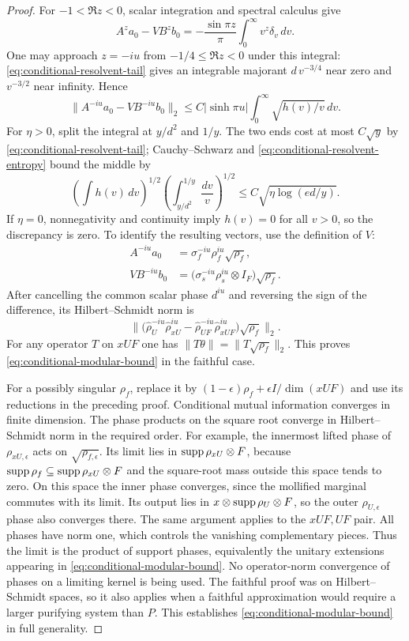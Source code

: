 \begin{proof}
For $-1<\Re z<0$, scalar integration and spectral calculus give
\[
 A^za_0-VB^zb_0
 =-\frac{\sin\pi z}{\pi}
       \int_0^\infty v^z\delta_v\,dv.
\]
One may approach $z=-iu$ from $-1/4\le\Re z<0$ under this
integral: \eqref{eq:conditional-resolvent-tail} gives an
integrable majorant $d\,v^{-3/4}$ near zero and $v^{-3/2}$ near
infinity.  Hence
\[
 \|A^{-iu}a_0-VB^{-iu}b_0\|_2
 \le C|\sinh\pi u|\int_0^\infty\sqrt{h(v)/v}\,dv.
\]
For $\eta>0$, split the integral at $y/d^2$ and $1/y$.
The two ends cost at most $C\sqrt y$ by
\eqref{eq:conditional-resolvent-tail}; Cauchy--Schwarz and
\eqref{eq:conditional-resolvent-entropy} bound the middle by
\[
 \left(\int h(v)\,dv\right)^{1/2}
 \left(\int_{y/d^2}^{1/y}\frac{dv}{v}\right)^{1/2}
 \le C\sqrt{\eta\log(ed/y)}.
\]
If $\eta=0$, nonnegativity and continuity imply $h(v)=0$ for
all $v>0$, so the discrepancy is zero.  To identify the resulting
vectors, use the definition of $V$:
\[
 \begin{split}
 A^{-iu}a_0
   &=\sigma_f^{-iu}\rho_f^{iu}\sqrt{\rho_f},\\
 VB^{-iu}b_0
   &=\bigl(\sigma_s^{-iu}\rho_s^{iu}\otimes I_F\bigr)
                                      \sqrt{\rho_f}.
 \end{split}
\]
After cancelling the common scalar phase $d^{iu}$ and reversing the
sign of the difference, its Hilbert--Schmidt norm is
\[
 \big\|\big(\widehat\rho_U^{-iu}\widehat\rho_{xU}^{iu}
       -\widehat\rho_{UF}^{-iu}\widehat\rho_{xUF}^{iu}\big)
                                    \sqrt{\rho_f}\big\|_2.
\]
For any operator $T$ on $xUF$ one has
$\|T\theta\|=\|T\sqrt{\rho_f}\|_2$.  This proves
\eqref{eq:conditional-modular-bound} in the faithful case.

For a possibly singular $\rho_f$, replace it by
$(1-\epsilon)\rho_f+\epsilon I/\dim(xUF)$ and use its
reductions in the preceding proof.  Conditional mutual information
converges in finite dimension.  The phase products on the square
root converge in Hilbert--Schmidt norm in the required order.
For example, the innermost lifted phase of $\rho_{xU,\epsilon}$
acts on $\sqrt{\rho_{f,\epsilon}}$.  Its limit lies in
$\operatorname{supp}\rho_{xU}\otimes F$, because
$\operatorname{supp}\rho_f\subseteq\operatorname{supp}\rho_{xU}\otimes F$ and
the square-root mass outside this space tends to zero.  On this
space the inner phase converges, since the mollified marginal
commutes with its limit.  Its output lies in
$x\otimes\operatorname{supp}\rho_U\otimes F$, so the outer
$\rho_{U,\epsilon}$ phase also converges there.  The same argument
applies to the $xUF,UF$ pair.  All phases have norm one, which
controls the vanishing complementary pieces.  Thus the limit is
the product of support phases, equivalently the unitary extensions
appearing in \eqref{eq:conditional-modular-bound}.  No
operator-norm convergence of phases on a limiting kernel is being
used.  The faithful proof was on Hilbert--Schmidt spaces, so it
also applies when a faithful approximation would require a larger
purifying system than $P$.  This establishes
\eqref{eq:conditional-modular-bound} in full generality.
\end{proof}

